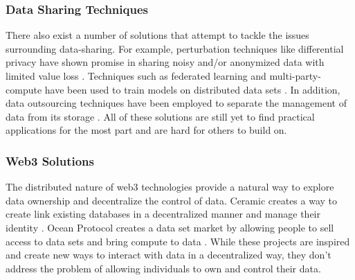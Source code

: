 \subsubsection{Data Sharing Techniques}
There also exist a number of solutions that attempt to tackle the issues surrounding data-sharing. For example, perturbation techniques like differential privacy 
have shown promise in sharing noisy and/or anonymized data with limited value loss \cite{dwork2008differential}. Techniques such as federated learning and  
multi-party-compute have been used to train models on distributed data sets \cite{li2020federated}\cite{lindell2005secure}. In addition, data outsourcing 
techniques have been employed to separate the management of data from its storage \cite{di2007data}. All of these solutions are still yet to find practical applications 
for the most part and are hard for others to build on.

\subsubsection{Web3 Solutions}
The distributed nature of web3 technologies provide a natural way to explore data ownership and decentralize the control of data. Ceramic creates a way to 
create link existing databases in a decentralized manner and manage their identity \cite{CeramicNetwork}. Ocean Protocol creates a data set market by allowing 
people to sell access to data sets and bring compute to data \cite{OceanProtocol}. While these projects are inspired and create new ways to interact with data 
in a decentralized way, they don't address the problem of allowing individuals to own and control their data. 